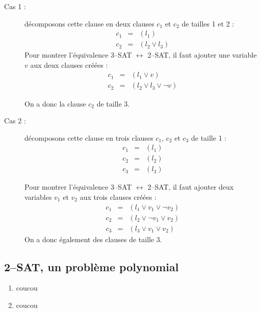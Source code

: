 \begin{description}
\item[Cas 1 :] décomposons cette clause en deux clauses $c_1$ et $c_2$ de tailles 1 et 2 :
\begin{eqnarray*}
c_1&=&(l_1) \\
c_2&=&(l_2 \vee l_3)
\end{eqnarray*}
Pour montrer l'équivalence 3--SAT $\leftrightarrow$ 2--SAT, il faut ajouter une variable $v$ aux deux clauses créées :
\begin{eqnarray*}
c_1&=&(l_1 \vee v) \\
c_2&=&(l_2 \vee l_3 \vee \neg v)
\end{eqnarray*}

On a donc la clause $c_2$ de taille 3.

\item[Cas 2 :] décomposons cette clause en trois clauses $c_1$, $c_2$ et $c_3$ de taille 1 :
\begin{eqnarray*}
c_1 & = & (l_1) \\
c_2 & = & (l_2) \\
c_3 & = & (l_3)
\end{eqnarray*}

Pour montrer l'équivalence 3--SAT $\leftrightarrow$ 2--SAT, il faut ajouter deux variables $v_1$ et $v_2$ aux trois clauses créées :
\begin{eqnarray*}
c_1 & = & (l_1 \vee v_1 \vee \neg v_2) \\
c_2 & = & (l_2 \vee \neg v_1 \vee v_2)\\
c_3 & = & (l_3 \vee v_1 \vee v_2)
\end{eqnarray*}
On a donc également des clauses de taille 3.
\end{description}




\subsection{2--SAT, un problème polynomial}
\begin{enumerate}
\item coucou
\item coucou
\end{enumerate}

